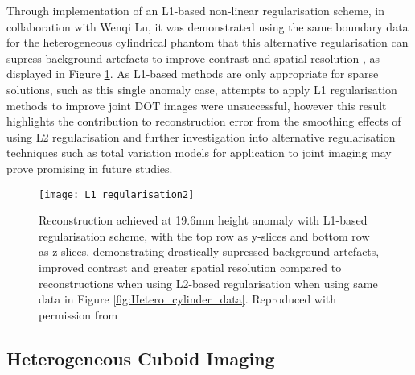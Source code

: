 \documentclass[twoside]{bhamthesis}
\theoremstyle{definition}
\begin{document}
Through implementation of an L1-based non-linear regularisation scheme, in collaboration with Wenqi Lu, it was demonstrated using the same boundary data for the heterogeneous cylindrical phantom that this alternative regularisation can supress background artefacts to improve contrast and spatial resolution \cite{lu20181}, as displayed in Figure \ref{fig:L1_regularisation}. As L1-based methods are only appropriate for sparse solutions, such as this single anomaly case, attempts to apply L1 regularisation methods to improve joint DOT images were unsuccessful, however this result highlights the contribution to reconstruction error from the smoothing effects of using L2 regularisation and further investigation into alternative regularisation techniques such as total variation models \cite{lu2019graph} for application to joint imaging may prove promising in future studies.

\begin{figure}[!ht]
\centering
  \texttt{[image: L1\_regularisation2]}
  \caption{Reconstruction achieved at 19.6mm height anomaly with L1-based regularisation scheme, with the top row as y-slices and bottom row as z slices, demonstrating drastically supressed background artefacts, improved contrast and greater spatial resolution compared to reconstructions when using L2-based regularisation when using same data in Figure \ref{fig:Hetero_cylinder_data}. Reproduced with permission from \cite{lu20181}}
    \label{fig:L1_regularisation}
\end{figure}


\subsection{Heterogeneous Cuboid Imaging}
\label{Heterogenous Cuboid Imaging}
\end{document}

